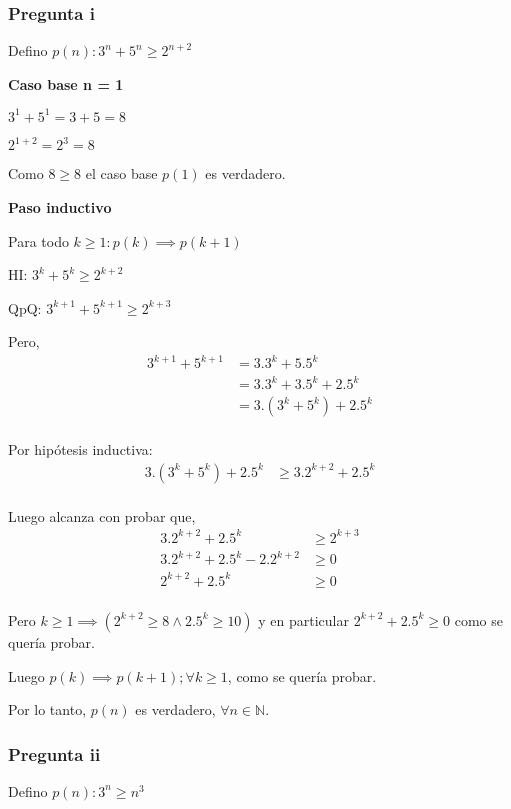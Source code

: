 \subsubsection{Pregunta i}

Defino $ p(n): 3^n + 5^n \geq 2^{n+2}$

\textbf{Caso base n = 1}

$3^1 + 5^1 = 3 + 5 = 8$

$2^{1+2} = 2^3 = 8$

Como $ 8 \geq 8 $ el caso base $p(1)$ es verdadero.

\textbf{Paso inductivo}

Para todo $k \geq 1: p(k) \implies p(k+1)$

HI: $ 3^k + 5^k \geq 2^{k+2}$

QpQ: $ 3^{k+1} + 5^{k+1} \geq 2^{k+3}$

Pero,
\begin{align*}
    3^{k+1} + 5^{k+1} &= 3.3^k + 5.5^k \\ 
    &= 3.3^k + 3.5^k + 2.5^k \\
    &= 3.(3^k + 5^k) + 2.5^k \\
\end{align*}

Por hipótesis inductiva:
\begin{align*}
    3.(3^k + 5^k) + 2.5^k &\geq 3.2^{k+2} + 2.5^k \\
\end{align*}

Luego alcanza con probar que,
\begin{align*}
    3.2^{k+2} + 2.5^k &\geq 2^{k+3} \\
    3.2^{k+2} + 2.5^k - 2.2^{k+2} &\geq 0 \\
    2^{k+2} + 2.5^k &\geq 0 \\
\end{align*}

Pero $k \geq 1 \implies (2^{k+2} \geq 8 \wedge 2.5^k \geq 10)$ y en particular $2^{k+2} + 2.5^k \geq 0 $ como se quería probar.

Luego $p(k) \implies p(k+1); \forall k \geq 1$, como se quería probar.

Por lo tanto, $p(n)$ es verdadero, $\forall n \in \mathbb{N}$.

\subsubsection{Pregunta ii}

Defino $ p(n): 3^n \geq n^3$

